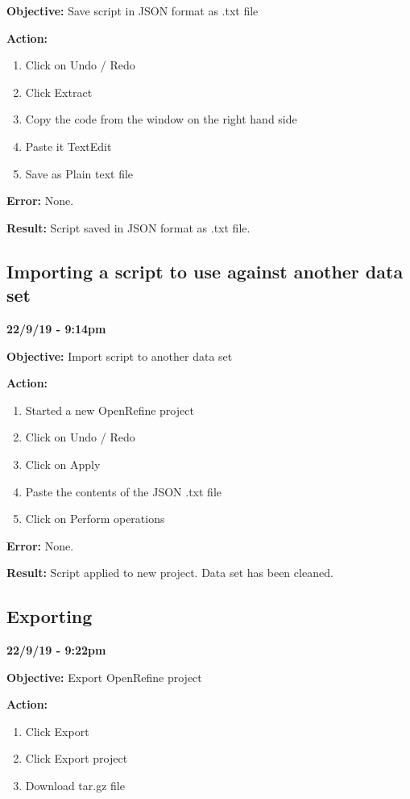\documentclass{article}
\begin{document}
\textbf{Objective:} Save script in JSON format as .txt file

\textbf{Action:}

\begin{enumerate}
    \item Click on Undo / Redo
    \item Click Extract
    \item Copy the code from the window on the right hand side
    \item Paste it TextEdit
    \item Save as Plain text file
\end{enumerate}

\textbf{Error:} None.

\textbf{Result:} Script saved in JSON format as .txt file.

\subsection{Importing a script to use against another data set}

\textbf{22/9/19 - 9:14pm}

\textbf{Objective:} Import script to another data set

\textbf{Action:}

\begin{enumerate}
    \item Started a new OpenRefine project
    \item Click on Undo / Redo
    \item Click on Apply
    \item Paste the contents of the JSON .txt file
    \item Click on Perform operations
\end{enumerate}

\textbf{Error:} None.

\textbf{Result:} Script applied to new project. Data set has been cleaned.

\subsection{Exporting}

\textbf{22/9/19 - 9:22pm}

\textbf{Objective:} Export OpenRefine project

\textbf{Action:}

\begin{enumerate}
    \item Click Export
    \item Click Export project
    \item Download tar.gz file
\end{enumerate}
\end{document}
